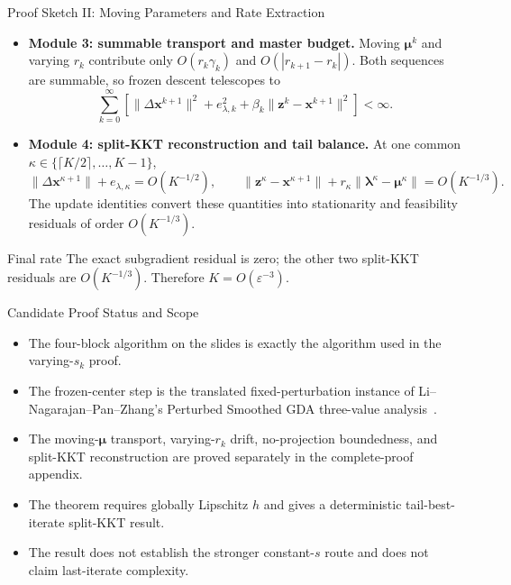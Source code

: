\documentclass[handout,compress,9pt]{beamer}
\newcommand{\red}[1]{\textcolor{ddlred}{#1}}
\newcommand{\bx}{\bm{x}}
\newcommand{\bz}{\bm{z}}
\newcommand{\bmu}{\bm{\mu}}
\newcommand{\blmbd}{\bm{\lambda}}
\newcommand{\eps}{\varepsilon}
\begin{document}
\begin{frame}{Proof Sketch II: Moving Parameters and Rate Extraction}
\footnotesize
\begin{itemize}
  \setlength{\itemsep}{0.16cm}
  \item[\red{$\blacktriangleright$}]
  \textbf{Module 3: summable transport and master budget.}
  Moving $\bmu^k$ and varying $r_k$ contribute only
  $O(r_k\gamma_k)$ and $O(|r_{k+1}-r_k|)$.  Both sequences are summable, so
  frozen descent telescopes to
  \begin{equation*}
    \sum_{k=0}^{\infty}\left[
    \|\Delta\bx^{k+1}\|^2+e_{\lambda,k}^2
    +\beta_k\|\bz^k-\bx^{k+1}\|^2\right]<\infty.
  \end{equation*}
  \hfill\hyperlink{appendix:candidate-transport}{}

  \item[\red{$\blacktriangleright$}]
  \textbf{Module 4: split-KKT reconstruction and tail balance.}
  At one common $\kappa\in\{\lceil K/2\rceil,\ldots,K-1\}$,
  \begin{equation*}
    \|\Delta\bx^{\kappa+1}\|+e_{\lambda,\kappa}=O(K^{-1/2}),
    \qquad
    \|\bz^\kappa-\bx^{\kappa+1}\|
    +r_\kappa\|\blmbd^\kappa-\bmu^\kappa\|=O(K^{-1/3}).
  \end{equation*}
  The update identities convert these quantities into stationarity and
  feasibility residuals of order $O(K^{-1/3})$.
  \hfill\hyperlink{appendix:candidate-residual}{}
\end{itemize}
\begin{block}{Final rate}
The exact subgradient residual is zero; the other two split-KKT residuals are
$O(K^{-1/3})$.  Therefore $K=O(\eps^{-3})$.
\end{block}
\end{frame}

\begin{frame}{Candidate Proof Status and Scope}
\small
\begin{itemize}
  \setlength{\itemsep}{0.18cm}
  \item The four-block algorithm on the slides is exactly the algorithm used
  in the varying-$s_k$ proof.
  \item The frozen-center step is the translated fixed-perturbation instance
  of Li--Nagarajan--Pan--Zhang's Perturbed Smoothed GDA
  three-value analysis~{\normalfont[4]}.
  \item The moving-$\bmu$ transport, varying-$r_k$ drift, no-projection
  boundedness, and split-KKT reconstruction are proved separately in
  the complete-proof appendix.
  \item The theorem requires globally Lipschitz $h$ and gives a
  deterministic tail-best-iterate split-KKT result.
  \item The result does not establish the stronger constant-$s$ route and
  does not claim last-iterate complexity.
\end{itemize}
\end{frame}
\end{document}
